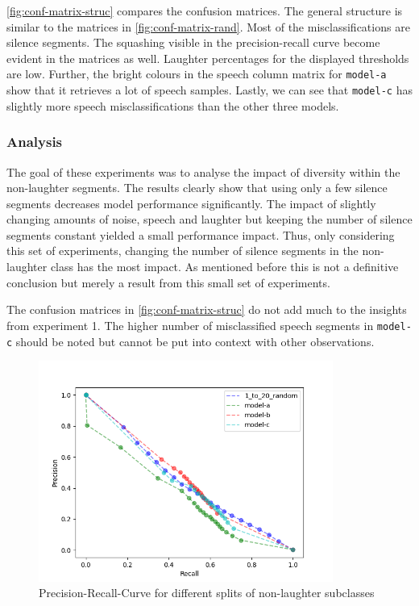 \documentclass[bsc,frontabs,parskip,deptreport]{infthesis}
\begin{document}
\autoref{fig:conf-matrix-struc} compares the confusion matrices. The general structure is similar to the matrices in \autoref{fig:conf-matrix-rand}.
Most of the misclassifications are silence segments. 
The squashing visible in the precision-recall curve become evident in the matrices as well. Laughter percentages for the displayed thresholds are low. 
Further, the bright colours in the speech column matrix for \texttt{model-a} show that it retrieves a lot of speech samples. 
Lastly, we can see that \texttt{model-c} has slightly more speech misclassifications than the other three models.


\subsubsection{Analysis}
The goal of these experiments was to analyse the impact of diversity within the non-laughter segments. The results clearly show that using only a few silence segments decreases model performance significantly. The impact of slightly changing amounts of noise, speech and laughter but keeping the number of silence segments constant yielded a small performance impact. 
Thus, only considering this set of experiments, changing the number of silence segments in the non-laughter class has the most impact. 
As mentioned before this is not a definitive conclusion but merely a result from this small set of experiments. 

The confusion matrices in \autoref{fig:conf-matrix-struc} do not add much to the insights from experiment 1. The higher number of misclassified speech segments in \texttt{model-c} should be noted but cannot be put into context with other observations.

\begin{figure}
    \centering
    \includegraphics[width = 3.8in]{imgs/prec-recall/structured/dev_compare_class_balance_dev_set.png}
    \caption{Precision-Recall-Curve for different splits of non-laughter subclasses}
    \label{fig:prec-recall-struc}
\end{figure}
\end{document}
